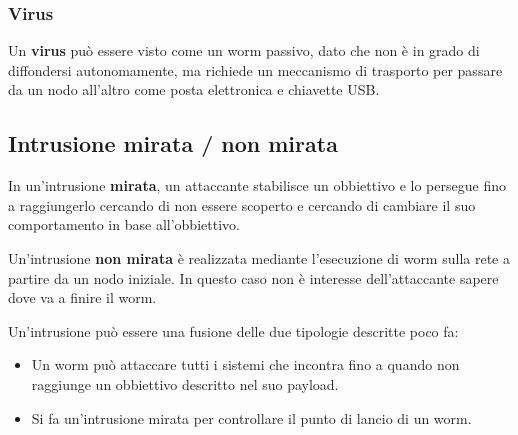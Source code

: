 \subsubsection{Virus}
Un \textbf{virus} può essere visto come un worm passivo, dato che non è in grado di diffondersi autonomamente, ma
richiede un meccanismo di trasporto per passare da un nodo all'altro come posta elettronica e chiavette USB.

\subsection{Intrusione mirata / non mirata}
In un'intrusione \textbf{mirata}, un attaccante stabilisce un obbiettivo e lo persegue fino a raggiungerlo cercando
di non essere scoperto e cercando di cambiare il suo comportamento in base all'obbiettivo.

Un'intrusione \textbf{non mirata} è realizzata mediante l'esecuzione di worm sulla rete a partire da un nodo iniziale.
In questo caso non è interesse dell'attaccante sapere dove va a finire il worm.

Un'intrusione può essere una fusione delle due tipologie descritte poco fa:
\begin{itemize}
	\item Un worm può attaccare tutti i sistemi che incontra fino a quando non raggiunge un obbiettivo descritto nel
	      suo payload.
	\item Si fa un'intrusione mirata per controllare il punto di lancio di un worm.
\end{itemize}